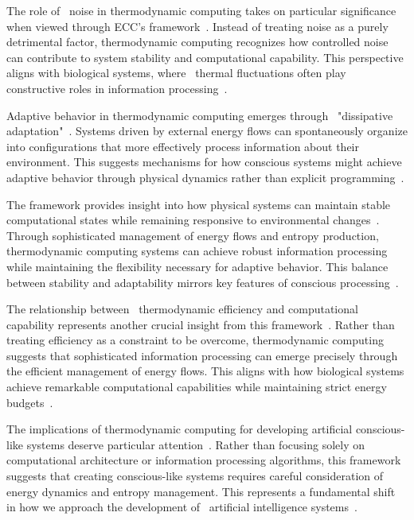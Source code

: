 The role of~ noise in thermodynamic computing takes on particular significance when viewed through ECC's framework~\cite{England2018}. Instead of treating noise as a purely detrimental factor, thermodynamic computing recognizes how controlled noise can contribute to system stability and computational capability. This perspective aligns with biological systems, where~ thermal fluctuations often play constructive roles in information processing~\cite{faisal2008}.

Adaptive behavior in thermodynamic computing emerges through~ "dissipative adaptation"~\cite{England2018}. Systems driven by external energy flows can spontaneously organize into configurations that more effectively process information about their environment. This suggests mechanisms for how conscious systems might achieve adaptive behavior through physical dynamics rather than explicit programming~\cite{Friston2010}.

The framework provides insight into how physical systems can maintain stable computational states while remaining responsive to environmental changes~\cite{Maroney2019,Perunov2020}. Through sophisticated management of energy flows and entropy production, thermodynamic computing systems can achieve robust information processing while maintaining the flexibility necessary for adaptive behavior. This balance between stability and adaptability mirrors key features of conscious processing~\cite{kelso2012}.

The relationship between~ thermodynamic efficiency and computational capability represents another crucial insight from this framework~\cite{Wolpert2019}. Rather than treating efficiency as a constraint to be overcome, thermodynamic computing suggests that sophisticated information processing can emerge precisely through the efficient management of energy flows. This aligns with how biological systems achieve remarkable computational capabilities while maintaining strict energy budgets~\cite{laughlin2001}.

The implications of thermodynamic computing for developing artificial conscious-like systems deserve particular attention~\cite{Sagawa2018,Maroney2019}. Rather than focusing solely on computational architecture or information processing algorithms, this framework suggests that creating conscious-like systems requires careful consideration of energy dynamics and entropy management. This represents a fundamental shift in how we approach the development of~ artificial intelligence systems~\cite{Still2020}.

